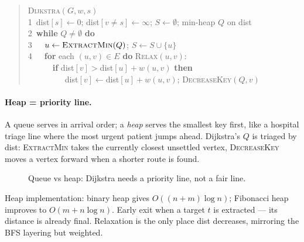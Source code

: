 \begin{quote}\ttfamily\scriptsize
\textsc{Dijkstra}$(G,w,s)$\\
1\ dist$[s]\gets0$; dist$[v\neq s]\gets\infty$; $S\gets\emptyset$; min-heap $Q$ on dist\\
2\ \textbf{while} $Q\neq\emptyset$ \textbf{do}\\
3\ \ \ $u\gets\textsc{ExtractMin}(Q)$; $S\gets S\cup\{u\}$\\
4\ \ \ \textbf{for} each $(u,v)\in E$ \textbf{do} \textsc{Relax}$(u,v)$:\\
\ \ \ \ \ \ \textbf{if} dist$[v]>$dist$[u]+w(u,v)$ \textbf{then}\\
\ \ \ \ \ \ \ \ \ dist$[v]\gets$dist$[u]+w(u,v)$; \textsc{DecreaseKey}$(Q,v)$
\end{quote}

\paragraph{Heap = priority line.} A queue serves in arrival order; a \emph{heap} serves the smallest key first, like a hospital triage line where the most urgent patient jumps ahead. Dijkstra's $Q$ is triaged by dist: \textsc{ExtractMin} takes the currently closest unsettled vertex, \textsc{DecreaseKey} moves a vertex forward when a shorter route is found.
\begin{figure}[h]\centering{}\caption{Queue vs heap: Dijkstra needs a priority line, not a fair line.}\label{fig:queue-vs-heap}\end{figure}
Heap implementation: binary heap gives $O((n+m)\log n)$; Fibonacci heap improves to $O(m+n\log n)$. Early exit when a target $t$ is extracted --- its distance is already final. Relaxation is the only place dist decreases, mirroring the BFS layering but weighted.

